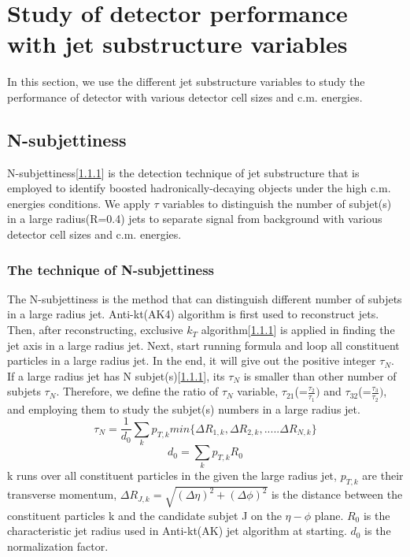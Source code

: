 \section{Study of detector performance with jet substructure variables}
In this section, we use the different jet substructure variables to study the performance of detector with various detector cell sizes and c.m. energies.\\


\subsection{N-subjettiness}
N-subjettiness[\ref{}] is the detection technique of jet substructure that is employed to identify boosted hadronically-decaying objects under the high c.m. energies conditions. We apply $\tau$ variables to distinguish the number of subjet(s) in a large radius(R=0.4) jets to separate signal from background with various detector cell sizes and c.m. energies.\\

\subsubsection{The technique of N-subjettiness}
The N-subjettiness is the method that can distinguish different number of subjets in a large radius jet. Anti-kt(AK4) algorithm is first used to reconstruct jets. Then, after reconstructing, exclusive $k_{T}$ algorithm[\ref{}] is applied in finding the jet axis in a large radius jet. Next, start running formula and loop all constituent particles in a large radius jet. In the end, it will give out the positive integer $\tau_{N}$. If a large radius jet has N subjet(s)[\ref{}], its $\tau_{N}$ is smaller than other number of subjets $\tau_{N}$. Therefore, we define the ratio of $\tau_{N}$ variable, $\tau_{21}$(=$\frac{\tau_{2}}{\tau_{1}})$ and $\tau_{32}$(=$\frac{\tau_{3}}{\tau_{2}})$, and  employing them to study the subjet(s) numbers in a large radius jet.\\
\begin{equation}\label{eq:Nsub_1}
\tau_{N}=\frac{1}{d_{0}}\sum_{k}p_{T,k} min\{\Delta R_{1,k},\Delta R_{2,k},.....\Delta R_{N,k}\}
\end{equation}
\begin{equation}
d_{0}=\sum_{k}p_{T,k} R_{0}
\end{equation}
k runs over all constituent particles in the given the large radius jet, $p_{T,k}$ are their transverse momentum, $\Delta R_{J,k}=\sqrt{(\Delta \eta)^{2}+(\Delta \phi)^{2}}$ is the distance between the constituent particles k and the candidate subjet J on the $\eta-\phi$ plane. $R_{0}$ is the characteristic jet radius used in Anti-kt(AK) jet algorithm at starting. $d_{0}$ is the normalization factor.\\

